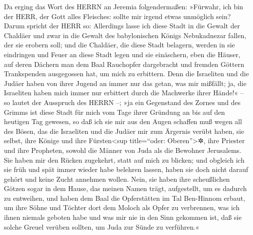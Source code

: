 Da erging das Wort des HERRN an Jeremia folgendermaßen:
»Fürwahr, ich bin der HERR, der Gott alles Fleisches:
sollte mir irgend etwas unmöglich sein? Darum spricht der
HERR so: Allerdings lasse ich diese Stadt in die Gewalt der Chaldäer und
zwar in die Gewalt des babylonischen Königs Nebukadnezar fallen, der sie
erobern soll; und die Chaldäer, die diese Stadt belagern,
werden in sie eindringen und Feuer an diese Stadt legen und sie
einäschern, eben die Häuser, auf deren Dächern man dem Baal Rauchopfer
dargebracht und fremden Göttern Trankspenden ausgegossen hat, um mich zu
erbittern. Denn die Israeliten und die Judäer haben von
ihrer Jugend an immer nur das getan, was mir mißfällt; ja, die
Israeliten haben mich immer nur erbittert durch die Machwerke ihrer
Hände!« -- so lautet der Ausspruch des HERRN --; »ja ein
Gegenstand des Zornes und des Grimms ist diese Stadt für mich vom Tage
ihrer Gründung an bis auf den heutigen Tag gewesen, so daß ich sie mir
aus den Augen schaffen muß wegen all des Bösen, das die
Israeliten und die Judäer mir zum Ärgernis verübt haben, sie selbst,
ihre Könige und ihre Fürsten\textless sup title=``oder:
Oberen''\textgreater✲, ihre Priester und ihre Propheten, sowohl die
Männer von Juda als die Bewohner Jerusalems. Sie haben
mir den Rücken zugekehrt, statt auf mich zu blicken; und obgleich ich
sie früh und spät immer wieder habe belehren lassen, haben sie doch
nicht darauf gehört und keine Zucht annehmen wollen.
Nein, sie haben ihre scheußlichen Götzen sogar in dem
Hause, das meinen Namen trägt, aufgestellt, um es dadurch zu entweihen,
und haben dem Baal die Opferstätten im Tal Ben-Hinnom
erbaut, um ihre Söhne und Töchter dort dem Moloch als Opfer zu
verbrennen, was ich ihnen niemals geboten habe und was mir nie in den
Sinn gekommen ist, daß sie solche Greuel verüben sollten, um Juda zur
Sünde zu verführen.«

